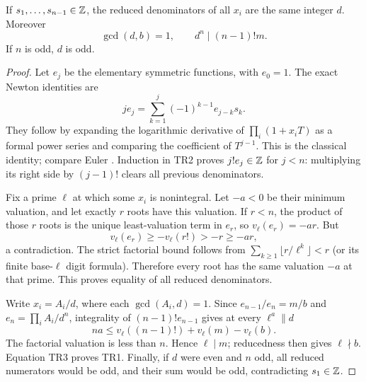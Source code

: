 \begin{theorem}\label{thm:general}
If $s_1,\ldots,s_{n-1}\in\mathbb Z$, the reduced denominators of all $x_i$ are the same
integer $d$. Moreover
\[
 \boxed{\gcd(d,b)=1,\qquad d^n\mid(n-1)!m.}                 \tag{TR1}
\]
If $n$ is odd, $d$ is odd.
\end{theorem}
\begin{proof}
Let $e_j$ be the elementary symmetric functions, with $e_0=1$. The exact Newton
identities are
\[
 j e_j=\sum_{k=1}^j(-1)^{k-1}e_{j-k}s_k.                 \tag{TR2}
\]
They follow by expanding the logarithmic derivative of
$\prod_i(1+x_iT)$ as a formal power series and comparing the coefficient of
$T^{j-1}$. This is the classical identity; compare Euler
\cite[\S\S3,5--7]{Euler}. Induction in TR2 proves
$j!e_j\in\mathbb Z$ for $j<n$: multiplying its right side by $(j-1)!$ clears all
previous denominators.

Fix a prime $\ell$ at which some $x_i$ is nonintegral. Let $-a<0$ be their
minimum valuation, and let exactly $r$ roots have this valuation. If $r<n$, the
product of those $r$ roots is the unique least-valuation term in $e_r$, so
$v_\ell(e_r)=-ar$. But
\[
 v_\ell(e_r)\ge-v_\ell(r!)>-r\ge-ar,
\]
a contradiction. The strict factorial bound follows from
$\sum_{k\ge1}\lfloor r/\ell^k\rfloor<r$ (or its finite base-$\ell$ digit
formula). Therefore every root has the same valuation $-a$ at that prime.
This proves equality of all reduced denominators.

Write $x_i=A_i/d$, where each $\gcd(A_i,d)=1$. Since
$e_{n-1}/e_n=m/b$ and $e_n=\prod_iA_i/d^n$, integrality of
$(n-1)!e_{n-1}$ gives at every $\ell^a\parallel d$
\[
 na\le v_\ell((n-1)!)+v_\ell(m)-v_\ell(b).              \tag{TR3}
\]
The factorial valuation is less than $n$. Hence $\ell\mid m$; reducedness then
gives $\ell\nmid b$. Equation TR3 proves TR1. Finally, if $d$ were even and
$n$ odd, all reduced numerators would be odd, and their sum would be odd,
contradicting $s_1\in\mathbb Z$.
\end{proof}

